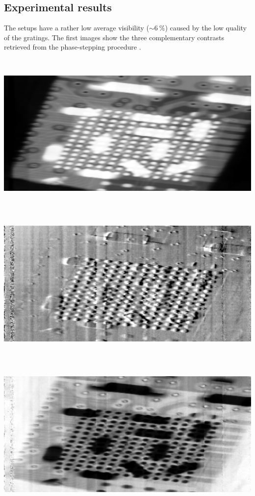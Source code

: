 \documentclass[a0,portrait]{a0poster}
\newenvironment{spacedcenter}{\vspace{2cm}\begin{center}}
        {\end{center}\vspace{2cm}\par}
\begin{document}
\begin{multicols}{2}
\section*{Experimental results}
The setups have a rather low average
visibility ($\sim\SI{6}{\percent}$) caused by the low quality of the
gratings. The first images show the three complementary contrasts retrieved
from the phase-stepping procedure \cite{Weitkamp2005}. 
\begin{spacedcenter}
    \includegraphics[width=0.3\linewidth,height=8cm]{images_S00075_S00071-img0.png}
    \includegraphics[width=0.3\linewidth,height=8cm]{images_S00075_S00071-img1.png}
    \includegraphics[width=0.3\linewidth,height=8cm]{images_S00075_S00071-img2.png}

\end{spacedcenter}
\end{multicols}
\end{document}
